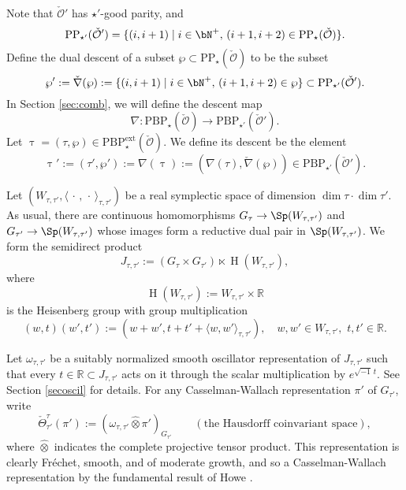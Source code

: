 \documentclass[12pt,a4paper]{amsart}
\newcommand{\CO}{{\mathcal {O}}}
\newcommand{\oH}{\operatorname{H}}
\newcommand{\R}{\mathbb R}
\def\DD{\nabla}
\newcommand{\la}{\langle}
\newcommand{\ra}{\rangle}
\numberwithin{equation}{section}
\theoremstyle{remark}
\def\PBPes{\mathrm{PBP}^{\mathrm{ext}}_{\star}}
\let\ytb=\ytableaushort
\newcommand{\tytb}[1]{{\tiny\ytb{#1}}}
\def\ckDD{{\check\DD}}
\def\PBP{\mathrm{PBP}}
\begin{document}
 Note that $\check \CO'$ has $\star'$-good parity, and
\[
 \mathrm{PP}_{\star'}(\check \CO')=\{(i,i+1)\mid i\in \bN^+, \, (i+1, i+2)\in \mathrm{PP}_{\star}(\check \CO) \}.
\]
Define the dual descent of a subset $\wp\subset \mathrm{PP}_{\star}(\check \CO)$ to be the subset 
\begin{equation}\label{eq:DD.wp}
  \wp':=\ckDD(\wp):=\{(i,i+1)\mid i\in \bN^+, \, (i+1, i+2)\in \wp \}\subset \mathrm{PP}_{\star'}(\check \CO').
\end{equation}
 In Section \ref{sec:comb}, we will define the descent map
 \[
   \nabla:  \mathrm{PBP}_\star(\check \CO)\rightarrow  \mathrm{PBP}_{\star'}(\check \CO').
 \]
Let  $\uptau = (\tau,\wp)\in \mathrm{\PBPes}(\check \CO)$.  We define its  descent be the element
 \[
  \uptau' := (\tau',\wp'):=\nabla(\uptau):= (\DD(\tau), \ckDD(\wp))\in \mathrm{\PBP}_{\star'}(\check \CO').
 \]

Let $(W_{\tau, \tau'}, \la \,\cdot\,,\,\cdot\,\ra_{\tau, \tau'})$ be a real symplectic space of  dimension $\dim \tau\cdot \dim \tau'$. As usual, there are continuous homomorphisms $G_\tau\rightarrow \Sp(W_{\tau, \tau'})$ and $G_{\tau'}\rightarrow \Sp(W_{\tau, \tau'})$ whose images form a reductive dual pair in $\Sp(W_{\tau, \tau'})$. We form the semidirect product
   \[
   J_{\tau, \tau'}:=(G_\tau\times G_{\tau'})\ltimes \oH(W_{\tau, \tau'}),
   \]
   where
  \[
  \oH(W_{\tau, \tau'}):=W_{\tau, \tau'}\times \R
  \]
  is the Heisenberg group with group multiplication
  \[
  (w,t)(w',t'):=(w+w', t+t'+\la w,w'\ra_{\tau, \tau'}), \quad
  w,w'\in W_{\tau, \tau'},\,\,t,t'\in \R.
 \]

 Let $\omega_{\tau, \tau'}$ be a suitably normalized smooth oscillator representation of $J_{\tau, \tau'}$ such that every $t\in \R\subset J_{\tau, \tau'}$ acts on it through the scalar multiplication by $e^{\sqrt{-1}\, t}$. %
 See Section \ref{secoscil} for details.
 For any Casselman-Wallach representation $\pi'$ of $G_{\tau'}$, write
 \[
   \check \Theta_{\tau'}^{\tau}(\pi'):=(\omega_{\tau, \tau'}\widehat \otimes \pi')_{G_{\tau'}} \qquad (\textrm{the Hausdorff coinvariant space}),
 \]
 where $\widehat \otimes$ indicates the complete projective tensor product. This representation is clearly Fr\'echet, smooth, and of moderate growth, and so a Casselman-Wallach representation by the fundamental result of Howe \cite{Howe89}.
\end{document}

